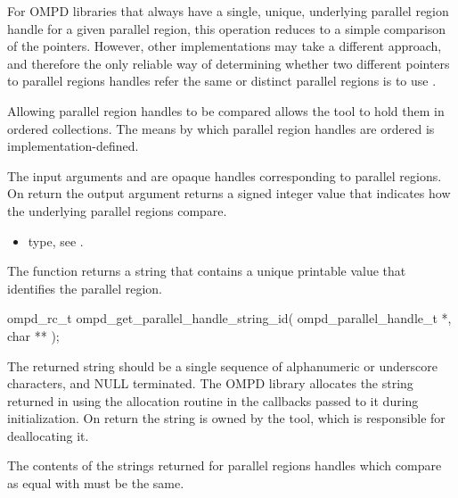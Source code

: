 For OMPD libraries that always have a single, unique, underlying parallel region handle for 
a given parallel region, this operation reduces to a simple comparison of the pointers. However, 
other implementations may take a different approach, and therefore the only reliable way of 
determining whether two different pointers to parallel regions handles refer the same or distinct
parallel regions is to use .

Allowing parallel region handles to be compared allows the tool to hold them in ordered 
collections. The means by which parallel region handles are ordered is implementation-defined.

\argdesc

The input arguments  and  are opaque handles 
corresponding to parallel regions.
On return the output argument   returns a signed 
integer value that indicates how the underlying parallel regions compare.

\crossreferences
\begin{itemize}
	\item {} type, see .
\end{itemize}

\label{subsubsubsec:ompd_get_parallel_handle_string_id}
\summary
The  function returns a string that contains a unique 
printable value that identifies the parallel region.

\format

\begin{cspecific}
\begin{ompSyntax}
ompd_rc_t ompd_get_parallel_handle_string_id(
  ompd_parallel_handle_t *,
  char **
);
\end{ompSyntax}
\end{cspecific}


\descr
The returned string should be a single sequence of alphanumeric or underscore characters, and 
NULL terminated. The OMPD library allocates the string returned in 
using the allocation routine in the callbacks passed to it during initialization. On return the string is 
owned by the tool, which is responsible for deallocating it.

The contents of the strings returned for parallel regions handles which compare as equal with
 must be the same.

